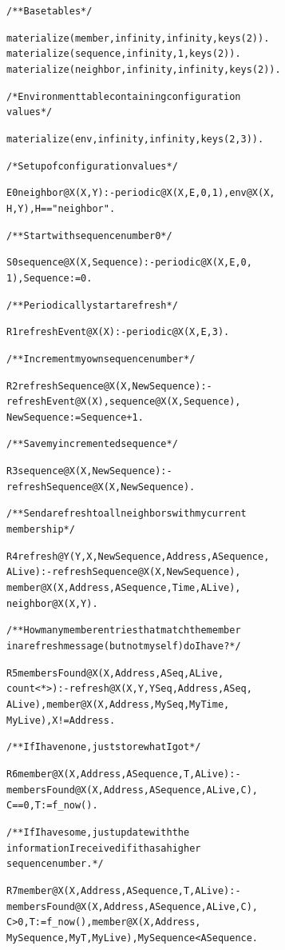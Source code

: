 \documentclass{sig-alt-full}
\newenvironment{overlog}{\begin{alltt}\small}{\end{alltt}}
\begin{document}
\begin{overlog}
/** Base tables */

materialize(member, infinity, infinity, keys(2)).
materialize(sequence, infinity, 1, keys(2)).
materialize(neighbor, infinity, infinity, keys(2)).


/* Environment table containing configuration
   values */

materialize(env, infinity, infinity, keys(2,3)).


/* Setup of configuration values */

E0 neighbor@X(X,Y) :- periodic@X(X,E,0,1), env@X(X,
  H, Y), H == "neighbor".


/** Start with sequence number 0 */

S0 sequence@X(X, Sequence) :- periodic@X(X, E, 0,
  1), Sequence := 0.


/** Periodically start a refresh */

R1 refreshEvent@X(X) :- periodic@X(X, E, 3).


/** Increment my own sequence number */

R2 refreshSequence@X(X, NewSequence) :-
  refreshEvent@X(X), sequence@X(X, Sequence),
  NewSequence := Sequence + 1.


/** Save my incremented sequence */

R3 sequence@X(X, NewSequence) :-
  refreshSequence@X(X, NewSequence).


/** Send a refresh to all neighbors with my current
  membership */

R4 refresh@Y(Y, X, NewSequence, Address, ASequence,
  ALive) :- refreshSequence@X(X, NewSequence),
  member@X(X, Address, ASequence, Time, ALive),
  neighbor@X(X, Y).


/** How many member entries that match the member
  in a refresh message (but not myself) do I have? */

R5 membersFound@X(X, Address, ASeq, ALive,
  count<*>) :- refresh@X(X, Y, YSeq, Address, ASeq,
  ALive), member@X(X, Address, MySeq, MyTime,
  MyLive), X != Address.


/** If I have none, just store what I got */

R6 member@X(X, Address, ASequence, T, ALive) :-
  membersFound@X(X, Address, ASequence, ALive, C),
  C == 0, T := f_now().


/** If I have some, just update with the
  information I received if it has a higher
  sequence number. */

R7 member@X(X, Address, ASequence, T, ALive) :-
  membersFound@X(X, Address, ASequence, ALive, C),
  C > 0, T := f_now(), member@X(X, Address,
  MySequence, MyT, MyLive), MySequence < ASequence.



\end{overlog}
\end{document}
